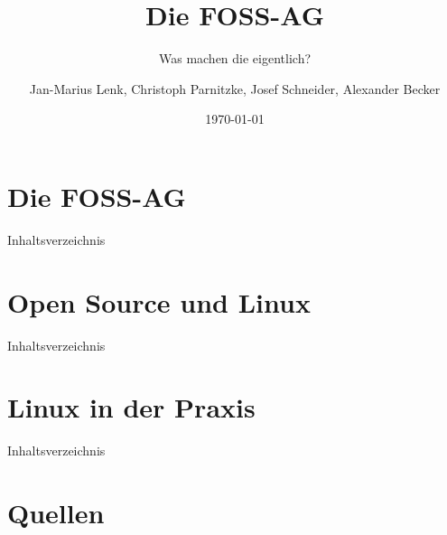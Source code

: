 \documentclass[12pt,utf8]{beamer}
\title{Die FOSS-AG}
\subtitle{Was machen die eigentlich?}
\author[J.-M. Lenk, C. Parnitzke, J. Schneider, A. Becker]{Jan-Marius Lenk, Christoph Parnitzke, Josef Schneider, Alexander Becker}
\institute[FOSS AG]{Free and Open Source Software AG\\ Fakultät für Informatik}
\date{\today}
\begin{document}
\begin{frame}
	\titlepage
\end{frame}

\section{Die FOSS-AG}

\begin{frame}{Inhaltsverzeichnis}
\end{frame}




\section{Open Source und Linux}

\begin{frame}{Inhaltsverzeichnis}
\end{frame}




\section{Linux in der Praxis}

\begin{frame}{Inhaltsverzeichnis}
\end{frame}




\section{Quellen}



\end{document}
